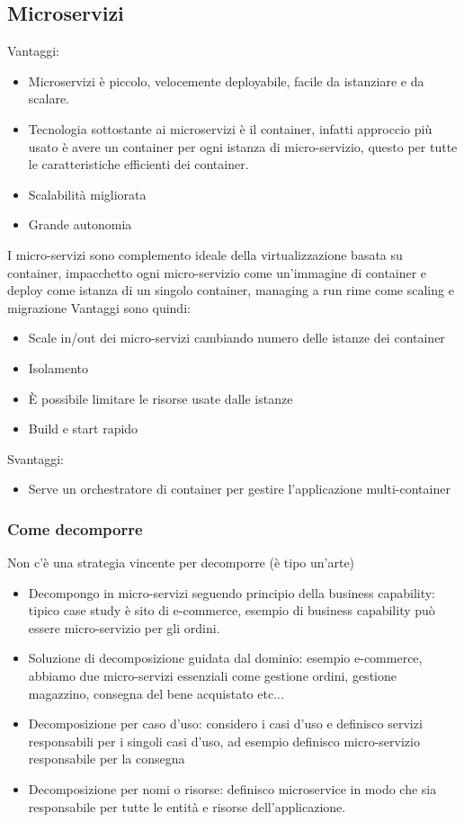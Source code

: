 \documentclass{article}
\begin{document}
\subsection{Microservizi}
Vantaggi:
\begin{itemize}
\item Microservizi è piccolo, velocemente deployabile, facile da istanziare e da scalare. 
\item Tecnologia sottostante ai microservizi è il container, infatti approccio più usato è avere un container per ogni istanza di micro-servizio, questo per tutte le caratteristiche efficienti dei container.
\item Scalabilità migliorata
\item Grande autonomia
\end{itemize}
I micro-servizi sono complemento ideale della virtualizzazione basata su container, impacchetto ogni micro-servizio come un'immagine di container e deploy come istanza di un singolo container, managing a run rime come scaling e migrazione
Vantaggi sono quindi:
\begin{itemize}
\item Scale in/out dei micro-servizi cambiando numero delle istanze dei container
\item Isolamento
\item È possibile limitare le risorse usate dalle istanze
\item Build e start rapido
\end{itemize}
Svantaggi:
\begin{itemize}
\item Serve un orchestratore di container per gestire l'applicazione multi-container
\end{itemize}
\subsubsection{Come decomporre}
Non c'è una strategia vincente per decomporre (è tipo un'arte)
\begin{itemize}
\item Decompongo in micro-servizi seguendo principio della business capability: tipico case study è sito di e-commerce, esempio di business capability può essere micro-servizio per gli ordini.
\item Soluzione di decomposizione guidata dal dominio: esempio e-commerce, abbiamo due micro-servizi essenziali come gestione ordini, gestione magazzino, consegna del bene acquistato etc...
\item Decomposizione per caso d'uso: considero i casi d'uso e definisco servizi responsabili per i singoli casi d'uso, ad esempio definisco micro-servizio responsabile per la consegna
\item Decomposizione per nomi o risorse: definisco microservice in modo che sia responsabile per tutte le entità e risorse dell'applicazione.
\end{itemize}
\end{document}
